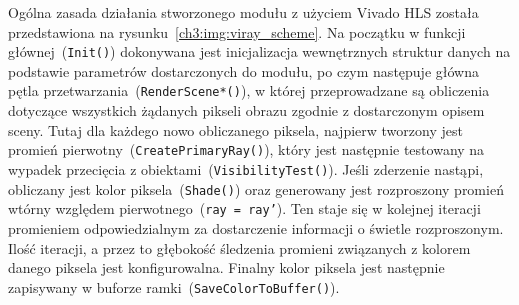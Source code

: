 
Ogólna zasada działania stworzonego modułu z użyciem Vivado HLS została przedstawiona na rysunku~\ref{ch3:img:viray_scheme}. Na początku w funkcji głównej~(\texttt{Init()}) dokonywana jest inicjalizacja wewnętrznych struktur danych na podstawie parametrów dostarczonych do modułu, po czym następuje główna pętla przetwarzania~(\texttt{RenderScene*()}), w której przeprowadzane są obliczenia dotyczące wszystkich żądanych pikseli obrazu zgodnie z dostarczonym opisem sceny. Tutaj dla każdego nowo obliczanego piksela, najpierw tworzony jest promień pierwotny~(\texttt{CreatePrimaryRay()}), który jest następnie testowany na wypadek przecięcia z obiektami~(\texttt{VisibilityTest()}). Jeśli zderzenie nastąpi, obliczany jest kolor piksela~(\texttt{Shade()}) oraz generowany jest rozproszony promień wtórny względem pierwotnego~(\texttt{ray = ray'}). Ten staje się w kolejnej iteracji promieniem odpowiedzialnym za dostarczenie informacji o świetle rozproszonym. Ilość iteracji, a przez to głębokość śledzenia promieni związanych z kolorem danego piksela jest konfigurowalna. Finalny kolor piksela jest następnie zapisywany w buforze ramki~(\texttt{SaveColorToBuffer()}).

